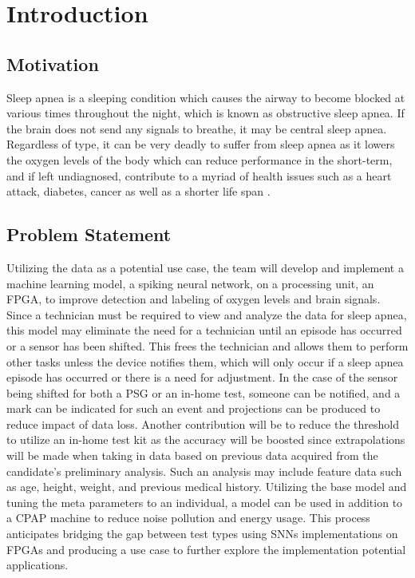 \documentclass[12pt,titlepage]{article}
\begin{document}
\section{Introduction}
\subsection{Motivation}
Sleep apnea is a sleeping condition which causes the airway to become blocked at various times throughout the night, which is known as obstructive sleep apnea. If the brain does not send any signals to breathe, it may be central sleep apnea. Regardless of type, it can be very deadly to suffer from sleep apnea as it lowers the oxygen levels of the body which can reduce performance in the short-term, and if left undiagnosed, contribute to a myriad of health issues such as a heart attack, diabetes, cancer as well as a shorter life span \cite{hopkins}. 
\subsection{Problem Statement}
Utilizing the data as a potential use case, the team will develop and implement a machine learning model, a spiking neural network, on a processing unit, an FPGA, to improve detection and labeling of oxygen levels and brain signals.  Since a technician must be required to view and analyze the data for sleep apnea, this model may eliminate the need for a technician until an episode has occurred or a sensor has been shifted. This frees the technician and allows them to perform other tasks unless the device notifies them, which will only occur if a sleep apnea episode has occurred or there is a need for adjustment. In the case of the sensor being shifted for both a PSG or an in-home test, someone can be notified, and a mark can be indicated for such an event and projections can be produced to reduce impact of data loss. Another contribution will be to reduce the threshold to utilize an in-home test kit as the accuracy will be boosted since extrapolations will be made when taking in data based on previous data acquired from the candidate’s preliminary analysis. Such an analysis may include feature data such as age, height, weight, and previous medical history. Utilizing the base model and tuning the meta parameters to an individual, a model can be used in addition to a CPAP machine to reduce noise pollution and energy usage. This process anticipates bridging the gap between test types using SNNs implementations on FPGAs and producing a use case to further explore the implementation potential applications.  
\end{document}
